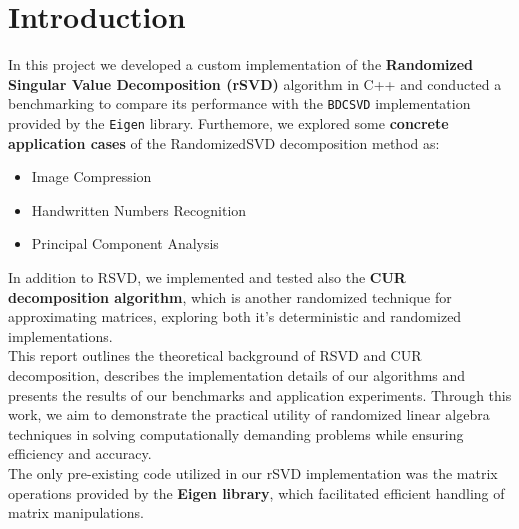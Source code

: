 \documentclass[11pt,a4paper]{article}
\begin{document}


\section{Introduction}
In this project we developed a custom implementation of the \textbf{Randomized Singular Value Decomposition (rSVD)} algorithm in C++ and conducted a benchmarking to compare its performance with the \texttt{BDCSVD} implementation provided by the \texttt{Eigen} library. Furthemore, we explored some \textbf{concrete application cases} of the RandomizedSVD decomposition method as:
\begin{itemize}
    \item Image Compression
    \item Handwritten Numbers Recognition
    \item Principal Component Analysis
\end{itemize}
In addition to RSVD, we implemented and tested also the \textbf{CUR decomposition algorithm}, which is another randomized technique for approximating matrices, exploring both it's deterministic and randomized implementations.\\
This report outlines the theoretical background of RSVD and CUR decomposition, describes the implementation details of our algorithms and presents the results of our benchmarks and application experiments. Through this work, we aim to demonstrate the practical utility of randomized linear algebra techniques in solving computationally demanding problems while ensuring efficiency and accuracy. \\
The only pre-existing code utilized in our rSVD implementation was the matrix operations provided by the \textbf{Eigen library}, which facilitated efficient handling of matrix manipulations.

\end{document}
